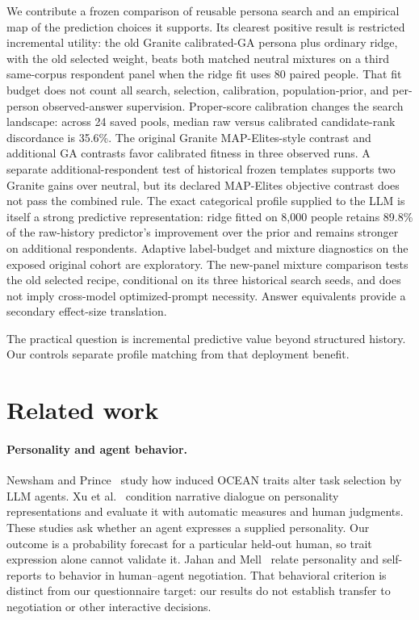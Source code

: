 \documentclass[sigconf,anonymous]{aamas}
\begin{document}
We contribute a frozen comparison of reusable persona search and an empirical
map of the prediction choices it supports. Its clearest positive result is
restricted incremental utility: the old Granite calibrated-GA persona plus
ordinary ridge, with the old selected weight, beats both matched neutral
mixtures on a third same-corpus respondent panel when the ridge fit uses 80
paired people. That fit budget does not count all search, selection,
calibration, population-prior, and per-person observed-answer supervision.
Proper-score calibration changes
the search landscape: across 24 saved pools, median raw versus calibrated
candidate-rank discordance is 35.6\%. The original Granite MAP-Elites-style
contrast and additional GA contrasts favor calibrated fitness in three
observed runs. A separate additional-respondent test of historical frozen
templates supports two Granite gains over neutral, but its declared MAP-Elites
objective contrast does not pass the combined rule. The exact categorical
profile supplied to the LLM is itself a strong predictive representation:
ridge fitted on 8,000 people retains 89.8\% of the raw-history predictor's
improvement over the prior and remains stronger on additional respondents.
Adaptive label-budget and mixture diagnostics on the exposed original cohort
are exploratory. The new-panel mixture comparison tests the old selected
recipe, conditional on its three historical search seeds, and does not imply
cross-model optimized-prompt necessity. Answer equivalents provide a secondary
effect-size translation.

The practical question is incremental predictive value beyond structured
history. Our controls separate profile matching from that deployment benefit.

\section{Related work}\label{sec:related}
\paragraph{Personality and agent behavior.}
Newsham and Prince~\cite{newsham2025personality} study how induced OCEAN
traits alter task selection by LLM agents. Xu et al.~\cite{xu2023dialogues}
condition narrative dialogue on personality representations and evaluate it
with automatic measures and human judgments. These studies ask whether an
agent expresses a supplied personality. Our outcome is a probability forecast
for a particular held-out human, so trait expression alone cannot validate it.
Jahan and Mell~\cite{jahan2024negotiation} relate personality and self-reports
to behavior in human--agent negotiation. That behavioral criterion is distinct
from our questionnaire target: our results do not establish transfer to
negotiation or other interactive decisions.
\end{document}
